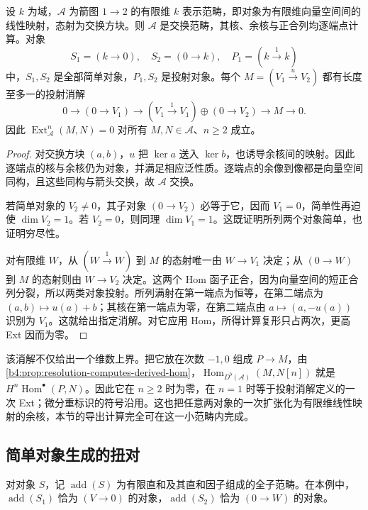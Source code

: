 \begin{proposition}\label{b4:prop:two-vertex-projective-resolution}
	设 \(k\) 为域，\(\mathcal A\) 为箭图 \(1\to2\) 的有限维 \(k\) 表示范畴，即对象为有限维向量空间间的线性映射，态射为交换方块。则 \(\mathcal A\) 是交换范畴，其核、余核与正合列均逐端点计算。对象
	\[
		S_1=(k\to0),\quad S_2=(0\to k),\quad P_1=(k\xrightarrow{1}k)
	\]
	中，\(S_1,S_2\) 是全部简单对象，\(P_1,S_2\) 是投射对象。每个 \(M=(V_1\xrightarrow{u}V_2)\) 都有长度至多一的投射消解
	\[
		0\longrightarrow(0\to V_1) \longrightarrow(V_1\xrightarrow{1}V_1)\oplus(0\to V_2) \longrightarrow M\longrightarrow0.
	\]
	因此 \(\operatorname{Ext}_{\mathcal A}^n(M,N)=0\) 对所有 \(M,N\in\mathcal A\)、\(n\ge2\) 成立。
\end{proposition}
\begin{proof}
	对交换方块 \((a,b)\)，\(u\) 把 \(\ker a\) 送入 \(\ker b\)，也诱导余核间的映射。因此逐端点的核与余核仍为对象，并满足相应泛性质。逐端点的余像到像都是向量空间同构，且这些同构与箭头交换，故 \(\mathcal A\) 交换。

	若简单对象的 \(V_2\ne0\)，其子对象 \((0\to V_2)\) 必等于它，因而 \(V_1=0\)，简单性再迫使 \(\dim V_2=1\)。若 \(V_2=0\)，则同理 \(\dim V_1=1\)。这既证明所列两个对象简单，也证明穷尽性。

	对有限维 \(W\)，从 \((W\xrightarrow{1}W)\) 到 \(M\) 的态射唯一由 \(W\to V_1\) 决定；从 \((0\to W)\) 到 \(M\) 的态射则由 \(W\to V_2\) 决定。这两个 Hom 函子正合，因为向量空间的短正合列分裂，所以两类对象投射。所列满射在第一端点为恒等，在第二端点为 \((a,b)\mapsto u(a)+b\)；其核在第一端点为零，在第二端点由 \(a\mapsto(a,-u(a))\) 识别为 \(V_1\)。这就给出指定消解。对它应用 Hom，所得计算复形只占两次，更高 Ext 因而为零。
\end{proof}

该消解不仅给出一个维数上界。把它放在次数 \(-1,0\) 组成 \(P\to M\)，由\cref{b4:prop:resolution-computes-derived-hom}，\(\operatorname{Hom}_{D^b(\mathcal A)}(M,N[n])\) 就是 \(H^n\operatorname{Hom}^{\bullet}(P,N)\)。因此它在 \(n\ge2\) 时为零，在 \(n=1\) 时等于投射消解定义的一次 Ext；微分重标识的符号沿用。这也把任意两对象的一次扩张化为有限维线性映射的余核，本节的导出计算完全可在这一小范畴内完成。

\subsection{简单对象生成的扭对}
\label{b4:subsec:1905:02}

对对象 \(S\)，记 \(\operatorname{add}(S)\) 为有限直和及其直和因子组成的全子范畴。在本例中，\(\operatorname{add}(S_1)\) 恰为 \((V\to0)\) 的对象，\(\operatorname{add}(S_2)\) 恰为 \((0\to W)\) 的对象。

